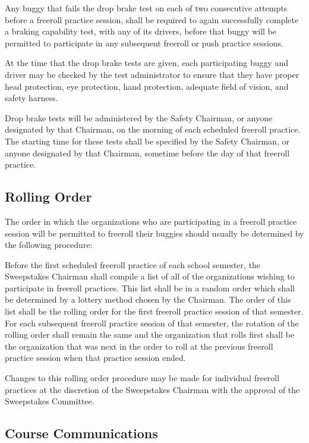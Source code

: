 	Any buggy that fails the drop brake test on each of two consecutive attempts
	before a freeroll practice session, shall be required to again successfully
	complete a braking capability test, with any of its drivers, before that buggy
	will be permitted to participate in any subsequent freeroll or push practice
	sessions.

	At the time that the drop brake tests are given, each participating buggy and
	driver may be checked by the test administrator to ensure that they have proper
	head protection, eye protection, hand protection, adequate field of vision, and
	safety harness.

	Drop brake tests will be administered by the Safety Chairman, or anyone
	designated by that Chairman, on the morning of each scheduled freeroll
	practice. The starting time for these tests shall be specified by the Safety
	Chairman, or anyone designated by that Chairman, sometime before the day of
	that freeroll practice.

\subsection{Rolling Order}

	The order in which the organizations who are participating in a freeroll
	practice session will be permitted to freeroll their buggies should usually be
	determined by the following procedure:

	Before the first scheduled freeroll practice of each school semester, the
	Sweepstakes Chairman shall compile a list of all of the organizations wishing
	to participate in freeroll practices. This list shall be in a random order
	which shall be determined by a lottery method chosen by the Chairman. The order
	of this list shall be the rolling order for the first freeroll practice session
	of that semester. For each subsequent freeroll practice session of that
	semester, the rotation of the rolling order shall remain the same and the
	organization that rolls first shall be the organization that was next in the
	order to roll at the previous freeroll practice session when that practice
	session ended.

	Changes to this rolling order procedure may be made for individual freeroll
	practices at the discretion of the Sweepstakes Chairman with the approval of
	the Sweepstakes Committee.

\subsection{Course Communications}

